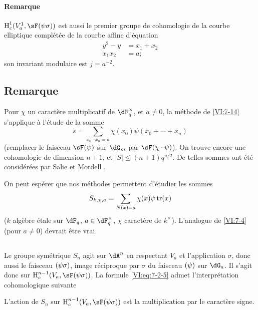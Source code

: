 \paragraph{Remarque}

$\h_c^1(V_a^1,\sF(\psi\sigma))$ est aussi le premier groupe de cohomologie de 
la courbe elliptique compl\'et\'ee de la courbe affine d'\'equation 
\begin{align*}
  y^2-y &= x_1+x_2 \\
  x_1 x_2 &= a \text{;} 
\end{align*}
son invariant modulaire est $j=a^{-2}$. 





\subsection{Remarque}\label{VI:7-18}

Pour $\chi$ un caract\`ere multiplicatif de $\dF_q^\times$, et $a\ne 0$, la 
m\'ethode de \ref{VI:7-14} s'applique \`a l'\'etude de la somme 
\[
  s = \sum_{x_0\dotsm x_n = a} \chi(x_0) \psi(x_0+\cdots + x_n) 
\]
(remplacer le faisceau $\sF(\psi)$ sur $\dG_m$ par $\sF(\chi\cdot \psi)$). On 
trouve encore une cohomologie de dimension $n+1$, et 
$|S|\leqslant (n+1)q^{n/2}$. De telles sommes ont \'et\'e consid\'er\'ees par 
Salie et Mordell \cite{mo73}.

On peut esp\'erer que nos m\'ethodes permettent d'\'etudier les sommes 
\[
  S_{k,\chi,a} = \sum_{N(x)=a} \chi(x) \psi \operatorname{tr}(x) 
\]
($k$ alg\`ebre \'etale sur $\dF_q$, $a\in \dF_q^\times$, $\chi$ caract\`ere de 
$k^\times$). L'analogue de \ref{VI:7-4} (pour $a\ne 0$) devrait \^etre vrai. 





\subsection{}\label{VI:7-19}

Le groupe sym\'etrique $S_n$ agit sur $\dA^n$ en respectant $V_a$ et 
l'application $\sigma$, donc aussi le faisceau $\sf(\psi\sigma)$, image 
r\'eciproque par $\sigma$ du faisceau $\sf(\psi)$ sur $\dG_a$. Il s'agit donc 
sur $\h_c^{n-1}(V_a,\sF(\psi\sigma))$. La formule \eqref{VI:eq:7-2-5} admet 
l'interpr\'etation cohomologique suivante





\begin{proposition_}\label{VI:7-20}
L'action de $S_n$ sur $\h_c^{n-1}(V_a,\sF(\psi\sigma))$ est la multiplication 
par le caract\`ere signe. 
\end{proposition_}

